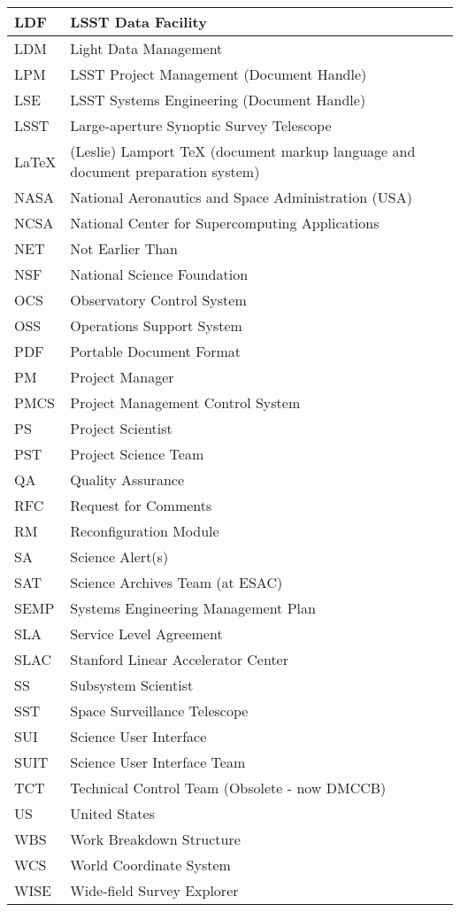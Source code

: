 \begin{longtable}{|l|p{}|}
LDF&LSST Data Facility \\\hline
LDM&Light Data Management \\\hline
LPM&LSST Project Management (Document Handle) \\\hline
LSE&LSST Systems Engineering (Document Handle) \\\hline
LSST&Large-aperture Synoptic Survey Telescope \\\hline
LaTeX&(Leslie) Lamport TeX (document markup language and document preparation system) \\\hline
NASA&National Aeronautics and Space Administration (USA) \\\hline
NCSA&National Center for Supercomputing Applications \\\hline
NET&Not Earlier Than \\\hline
NSF&National Science Foundation \\\hline
OCS&Observatory Control System \\\hline
OSS&Operations Support System \\\hline
PDF&Portable Document Format \\\hline
PM&Project Manager \\\hline
PMCS&Project Management Control System \\\hline
PS&Project Scientist \\\hline
PST&Project Science Team \\\hline
QA&Quality Assurance \\\hline
RFC&Request for Comments \\\hline
RM&Reconfiguration Module \\\hline
SA&Science Alert(s) \\\hline
SAT&Science Archives Team (at ESAC) \\\hline
SEMP&Systems Engineering Management Plan \\\hline
SLA&Service Level Agreement \\\hline
SLAC&Stanford Linear Accelerator Center \\\hline
SS&Subsystem Scientist \\\hline
SST&Space Surveillance Telescope \\\hline
SUI&Science User Interface \\\hline
SUIT&Science User Interface Team \\\hline
TCT&Technical Control Team (Obsolete - now DMCCB) \\\hline
US&United States \\\hline
WBS&Work Breakdown Structure \\\hline
WCS&World Coordinate System \\\hline
WISE&Wide-field Survey Explorer \\\hline
\end{longtable} 
